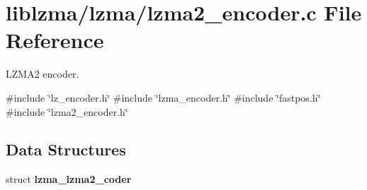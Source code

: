 \section{liblzma/lzma/lzma2\+\_\+encoder.c File Reference}
\label{lzma2__encoder_8c}


L\+Z\+M\+A2 encoder.  


{\ttfamily \#include \char`\"{}lz\+\_\+encoder.\+h\char`\"{}}\newline
{\ttfamily \#include \char`\"{}lzma\+\_\+encoder.\+h\char`\"{}}\newline
{\ttfamily \#include \char`\"{}fastpos.\+h\char`\"{}}\newline
{\ttfamily \#include \char`\"{}lzma2\+\_\+encoder.\+h\char`\"{}}\newline
\subsection*{Data Structures}
\begin{DoxyCompactItemize}
\item 
struct \textbf{ lzma\+\_\+lzma2\+\_\+coder}
\end{DoxyCompactItemize}
